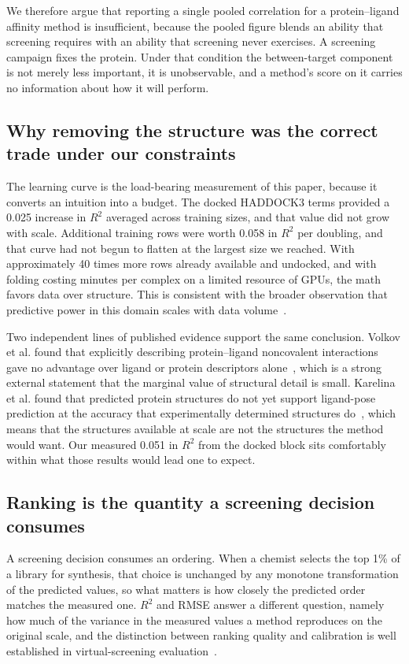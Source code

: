 \documentclass[times, twoside]{zHenriquesLab-StyleBioRxiv}
\newcommand{\pl}{protein--ligand\xspace}
\begin{document}
We therefore argue that reporting a single pooled correlation for a \pl affinity method is insufficient, because the pooled figure blends an ability that screening requires with an ability that screening never exercises. A screening campaign fixes the protein. Under that condition the between-target component is not merely less important, it is unobservable, and a method's score on it carries no information about how it will perform.

\subsection*{Why removing the structure was the correct trade under our constraints}

The learning curve is the load-bearing measurement of this paper, because it converts an intuition into a budget. The docked HADDOCK3 terms provided a 0.025 increase in $R^2$ averaged across training sizes, and that value did not grow with scale. Additional training rows were worth 0.058 in $R^2$ per doubling, and that curve had not begun to flatten at the largest size we reached. With approximately 40 times more rows already available and undocked, and with folding costing minutes per complex on a limited resource of GPUs, the math favors data over structure. This is consistent with the broader observation that predictive power in this domain scales with data volume~\cite{ramsundar2015multitask}.

Two independent lines of published evidence support the same conclusion. Volkov et al. found that explicitly describing \pl noncovalent interactions gave no advantage over ligand or protein descriptors alone~\cite{volkov2022frustration}, which is a strong external statement that the marginal value of structural detail is small. Karelina et al. found that predicted protein structures do not yet support ligand-pose prediction at the accuracy that experimentally determined structures do~\cite{karelina2023alphafold}, which means that the structures available at scale are not the structures the method would want. Our measured 0.051 in $R^2$ from the docked block sits comfortably within what those results would lead one to expect.

\subsection*{Ranking is the quantity a screening decision consumes}

A screening decision consumes an ordering. When a chemist selects the top 1\% of a library for synthesis, that choice is unchanged by any monotone transformation of the predicted values, so what matters is how closely the predicted order matches the measured one. $R^2$ and RMSE answer a different question, namely how much of the variance in the measured values a method reproduces on the original scale, and the distinction between ranking quality and calibration is well established in virtual-screening evaluation~\cite{truchon2007bedroc}.
\end{document}
